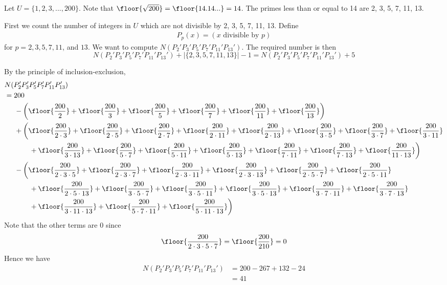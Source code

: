 
Let $U = \{1, 2, 3, ..., 200\}$.
Note that $\floor{\sqrt{200}} = \floor{14.14...} = 14$.
The primes less than or equal to 14 are 2, 3, 5, 7, 11, 13.

First we count the number of integers in $U$ which are
not divisible by 2, 3, 5, 7, 11, 13.
Define
\begin{align*}
P_p(x) = (x \text{ divisible by $p$})
\end{align*} 
for $p = 2, 3, 5, 7, 11$, and $13$.
We want to compute $N(P_2' P_3' P_5' P_7' P_{11}' P_{13}')$.
The required number is then
\[
N(P_2' P_3' P_5' P_7' P_{11}' P_{13}') + |\{2, 3, 5, 7, 11, 13\}| - 1
=
N(P_2' P_3' P_5' P_7' P_{11}' P_{13}') + 5
\]

By the principle of inclusion-exclusion,
\begin{align*}
&N(P_2' P_3' P_5' P_7' P_{11}' P_{13}') \\
&= 200  \\
&\hspace{0.5cm} - 
\left( 
\floor{\frac{200}{2}}
+ \floor{\frac{200}{3}} 
+ \floor{\frac{200}{5}} 
+ \floor{\frac{200}{7}} 
+ \floor{\frac{200}{11}} 
+ \floor{\frac{200}{13}} 
\right)  \\
&\hspace{0.5cm} + 
\biggl( 
\floor{\frac{200}{2 \cdot 3}}
+ \floor{\frac{200}{2 \cdot 5}} 
+ \floor{\frac{200}{2 \cdot 7}} 
+ \floor{\frac{200}{2 \cdot 11}} 
+ \floor{\frac{200}{2 \cdot 13}} 
+ \floor{\frac{200}{3 \cdot 5}} 
+ \floor{\frac{200}{3 \cdot 7}} 
+ \floor{\frac{200}{3 \cdot 11}} 
\\
&\hspace{1.25cm}
+ \floor{\frac{200}{3 \cdot 13}} 
+ \floor{\frac{200}{5 \cdot 7}}
+ \floor{\frac{200}{5 \cdot 11}} 
+ \floor{\frac{200}{5 \cdot 13}} 
+ \floor{\frac{200}{7 \cdot 11}} 
+ \floor{\frac{200}{7 \cdot 13}} 
+ \floor{\frac{200}{11 \cdot 13}} 
\biggr)  \\
&\hspace{0.5cm} -
\biggl( 
\floor{\frac{200}{2 \cdot 3 \cdot 5}}
+\floor{\frac{200}{2 \cdot 3 \cdot 7}}
+\floor{\frac{200}{2 \cdot 3 \cdot 11}}
+\floor{\frac{200}{2 \cdot 3 \cdot 13}}
+\floor{\frac{200}{2 \cdot 5 \cdot 7}}
+\floor{\frac{200}{2 \cdot 5 \cdot 11}}
\\
&\hspace{1.25cm}
+\floor{\frac{200}{2 \cdot 5 \cdot 13}}
+\floor{\frac{200}{3 \cdot 5 \cdot 7}}
+\floor{\frac{200}{3 \cdot 5 \cdot 11}}
+\floor{\frac{200}{3 \cdot 5 \cdot 13}} 
+\floor{\frac{200}{3 \cdot 7 \cdot 11}}
+\floor{\frac{200}{3 \cdot 7 \cdot 13}}
\\
&\hspace{1.25cm}
+\floor{\frac{200}{3 \cdot 11 \cdot 13}}
+\floor{\frac{200}{5 \cdot 7 \cdot 11}}
+\floor{\frac{200}{5 \cdot 11 \cdot 13}} \biggr)
\end{align*}
Note that the other terms are 0 since
\[
\floor{\frac{200}{2 \cdot 3 \cdot 5 \cdot 7}} = \floor{\frac{200}{210}} = 0
\]
Hence we have 
\begin{align*}
N(P_2' P_3' P_5' P_7' P_{11}' P_{13}') 
&= 200 - 267 + 132 - 24 \\
&= 41
\end{align*}

